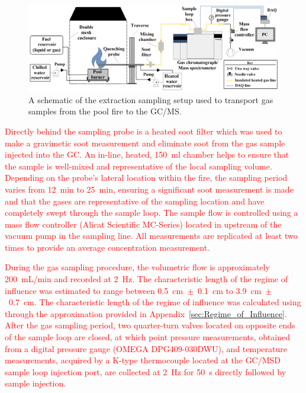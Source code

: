 \documentclass[12pt]{article}
\begin{document}
\begin{figure}
	\centering
\includegraphics[width=\textwidth,keepaspectratio]{Experimental_Setup.png}
	\caption[A schematic of the gas sampling procedure]{A schematic of the extraction sampling setup used to transport gas samples from the pool fire to the GC/MS.}
	\label{fig:Experimental_Setup}
\end{figure}

\textcolor{red}{Directly behind the sampling probe is a heated soot filter which was used to make a gravimetic soot measurement and eliminate soot from the gas sample injected into the GC. An in-line, heated, 150~ml chamber helps to ensure that the sample is well-mixed and representative of the local sampling volume. Depending on the probe's lateral location within the fire, the sampling period varies from \SI{12}{min} to \SI{25}{min}, ensuring a significant soot measurement is made and that the gases are representative of the sampling location and have completely swept through the sample loop. The sample flow is controlled using a mass flow controller (Alicat Scientific MC-Series) located in upstream of the vacuum pump in the sampling line. All measurements are replicated at least two times to provide an average concentration measurement.}

\textcolor{red}{During the gas sampling procedure, the volumetric flow is approximately 200~mL/min and recorded at \SI{2}{\hertz}. The characteristic length of the regime of influence was estimated to range between 0.5~cm~$\pm$~0.1~cm to 3.9~cm~$\pm$~0.7~cm. The characteristic length of the regime of influence was calculated using through the approximation provided in Appendix~\ref{sec:Regime_of_Influence}. After the gas sampling period, two quarter-turn valves located on opposite ends of the sample loop are closed, at which point pressure measurements, obtained from a digital pressure gauge (OMEGA DPG409-030DWU), and temperature measurements, acquired by a K-type thermocouple located at the GC/MSD sample loop injection port, are collected at \SI{2}{\hertz} for \SI{50}{s} directly followed by sample injection.}
\end{document}

